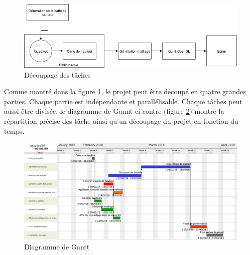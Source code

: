 \documentclass[12pt]{report}
\begin{document}
\begin{center}
\begin{figure}[!h]
  \includegraphics[scale=0.5]{img/DecoupageTache.png}
  \caption{Découpage des tâches}
  \label{fig:tache}
\end{figure}
\end{center}

Comme montré dans la figure \ref{fig:tache}, le projet peut être découpé
en quatre grandes parties.  Chaque partie est indépendante et
parallélisable. Chaque tâches peut aussi être divisée, le diagramme de
Gannt ci-contre (figure \ref{fig:gantt}) montre la répartition précise
des tâche ainsi qu'un découpage du projet en fonction du temps. 

\begin{center}
\begin{figure}[!h]
  \includegraphics[scale=0.25]{img/gantt.png}
  \caption{Diagramme de Gantt}
  \label{fig:gantt}
\end{figure}
\end{center}

{}

\end{document}
